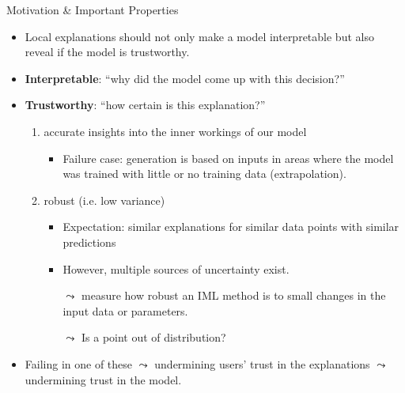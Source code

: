 \documentclass[11pt,compress,t,notes=noshow, aspectratio=169, xcolor=table]{beamer}
\begin{document}
\begin{vbframe}{Motivation \& Important Properties}
	\begin{itemize}
		\item Local explanations should not only make a model interpretable but also reveal if the model is trustworthy.
	    \item \textbf{Interpretable}: ``why did the model come up with this decision?''
	    \item \textbf{Trustworthy}: ``how certain is this explanation?''
	    \begin{enumerate}
	        \item accurate insights into the inner workings of our model
	        \begin{itemize}
	            \item Failure case: generation is based on inputs in areas where the model was trained with little or no training data (extrapolation).
	        \end{itemize}
	        \item robust (i.e. low variance)
	        \begin{itemize}
	            \item Expectation: similar explanations for similar data points with similar predictions
	            \item However, multiple sources of uncertainty exist.
	            \item[$\leadsto$] measure how robust an IML method is to small changes in the input data or parameters.
	            \item[$\leadsto$] Is a point out of distribution?
	        \end{itemize}
	    \end{enumerate}
		\item Failing in one of these $\leadsto$ undermining users' trust in the explanations $\leadsto$ undermining trust in the model. 
	\end{itemize}
\end{vbframe}
\end{document}
